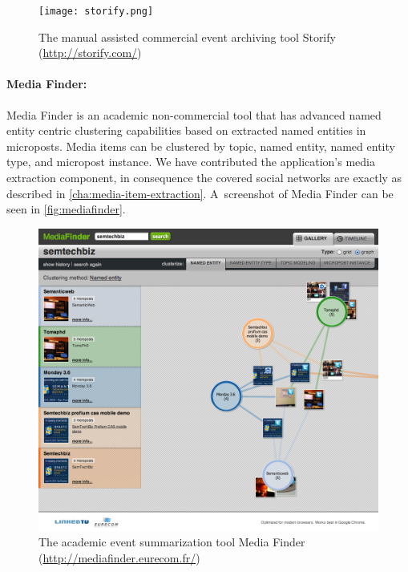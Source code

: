 \begin{figure}
  \centering
  \texttt{[image: storify.png]}
  \caption[The manual assisted commercial event archiving tool Storify]{The manual assisted commercial event archiving tool Storify
    (\url{http://storify.com/})}
  \label{fig:storify}
\end{figure}

\paragraph{Media Finder:}

Media Finder is an academic non-commercial tool that
has advanced named entity centric clustering capabilities
based on extracted named entities in microposts.
Media items can be clustered by topic, named entity,
named entity type, and micropost instance.
We have contributed the application's media extraction component,
in consequence the covered social networks
are exactly as described in \autoref{cha:media-item-extraction}.
A~screenshot of Media Finder can be seen in \autoref{fig:mediafinder}.

\begin{figure}
  \centering
  \includegraphics[width=\linewidth]{mediafinder.png}
  \caption[The academic event summarization tool Media Finder]{The academic event summarization tool Media Finder (\url{http://mediafinder.eurecom.fr/})}
  \label{fig:mediafinder}
\end{figure}

